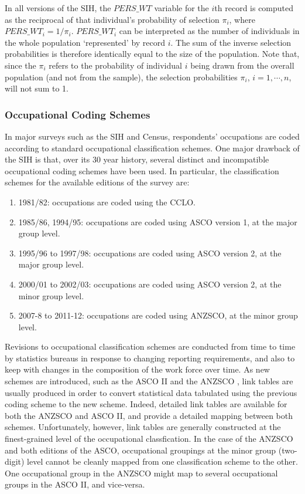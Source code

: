 In all versions of the SIH, the $PERS\_WT$ variable for the $i$th record is computed as the reciprocal of that individual's probability of selection $\pi_i$, where $PERS\_WT_i = 1/\pi_i.$ $PERS\_WT_i$ can be interpreted as the number of individuals in the whole population `represented' by record $i$. The sum of the inverse selection probabilities is therefore identically equal to the size of the population. Note that, since the $\pi_i$ refers to the probability of individual $i$ being drawn from the overall population (and not from the sample), the selection probabilities $\pi_i$, $i=1,\cdots,n$, will not sum to 1.



\subsubsection{Occupational Coding Schemes}
\label{sec:occcoding}

In major surveys such as the SIH and Census, respondents' occupations are coded according to standard occupational classification schemes. One major drawback of the SIH is that, over its 30 year history, several distinct and incompatible occupational coding schemes have been used. In particular, the classification schemes for the available editions of the survey are:
\begin{enumerate}
\item 1981/82: occupations are coded using the CCLO.
\item 1985/86, 1994/95: occupations are coded using ASCO version 1, at the major group level.
\item 1995/96 to 1997/98: occupations are coded using ASCO version 2, at the major group level.
\item 2000/01 to 2002/03: occupations are coded using ASCO version 2, at the minor group level.
\item 2007-8 to 2011-12: occupations are coded using ANZSCO, at the minor group level.
\end{enumerate}
Revisions to occupational classification schemes are conducted from time to time by statistics bureaus in response to changing reporting requirements, and also to keep with changes in the composition of the work force over time. As new schemes are introduced, such as the ASCO II \citep{Castles1986} and the ANZSCO \citep{Trewin2006}, link tables are usually produced in order to convert statistical data tabulated using the previous coding scheme to the new scheme. Indeed, detailed link tables are available for both the ANZSCO and ASCO II, and provide a detailed mapping between both schemes. Unfortunately, however, link tables are generally constructed at the finest-grained level of the occupational classfication. In the case of the ANZSCO and both editions of the ASCO, occupational groupings at the minor group (two-digit) level cannot be cleanly mapped from one classification scheme to the other. One occupational group in the ANZSCO might map to several occupational groups in the ASCO II, and vice-versa.

